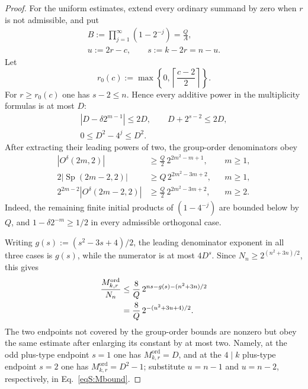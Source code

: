 \documentclass[journal,twocolumn]{IEEEtran}
\theoremstyle{definition}
\theoremstyle{plain}
\newcommand{\Ord}{\mathrm{ord}}
\newcommand{\Sp}{\operatorname{Sp}}
\begin{document}
\begin{proof}
For the uniform estimates, extend every ordinary summand by zero when $r$ is
not admissible, and put
\begin{equation}
 \begin{gathered}
 B:=\prod_{j=1}^{\infty}(1-2^{-j})=\frac QA,\\
 u:=2r-c,\qquad s:=k-2r=n-u.
 \end{gathered}
 \label{eqS:B-u}
\end{equation}
Let
\begin{equation}
 r_0(c):=\max\left\{0,\left\lceil\frac{c-2}{2}\right\rceil\right\}.
\end{equation}
For $r\geq r_0(c)$ one has $s-2\leq n$.  Hence every additive power in the
multiplicity formulas is at most $D$:
\begin{equation}
 \begin{gathered}
 |D-\delta2^{m-1}|\leq2D,\qquad D+2^{s-2}\leq2D,\\
 0\leq D^2-4^j\leq D^2.
 \end{gathered}
 \label{eqS:multiplicity-factor-bounds}
\end{equation}
After extracting their leading powers of two, the group-order denominators
obey
\begin{align}
 |O^\delta(2m,2)|
 &\geq \frac Q2\,2^{2m^2-m+1},
 &&m\geq1,\label{eqS:O-lower}\\
 2|\Sp(2m-2,2)|
 &\geq Q\,2^{2m^2-3m+2},
 &&m\geq1,\label{eqS:Sp-lower}\\
 2^{2m-2}|O^\delta(2m-2,2)|
 &\geq \frac Q2\,2^{2m^2-3m+2},
 &&m\geq2.\label{eqS:Ozero-lower}
\end{align}
Indeed, the remaining finite initial products of $(1-4^{-j})$ are bounded
below by $Q$, and $1-\delta2^{-m}\geq1/2$ in every admissible orthogonal
case.

Writing $g(s):=(s^2-3s+4)/2$, the leading denominator exponent in all three
cases is $g(s)$, while the numerator is at most $4D^s$.  Since
$N_n\geq2^{(n^2+3n)/2}$, this gives
\begin{align}
 \frac{M^{\Ord}_{k,r}}{N_n}
 &\leq\frac8Q\,2^{ns-g(s)-(n^2+3n)/2}\notag\\
 &=\frac8Q\,2^{-(u^2+3u+4)/2}.
 \label{eqS:Mbound}
\end{align}
The two endpoints not covered by the group-order bounds are nonzero but obey
the same estimate after enlarging its constant by at most two.  Namely, at
the odd plus-type endpoint $s=1$ one has $M^{\Ord}_{k,r}=D$, and at the
$4\mid k$ plus-type endpoint $s=2$ one has
$M^{\Ord}_{k,r}=D^2-1$; substitute $u=n-1$ and $u=n-2$, respectively, in
Eq.~\eqref{eqS:Mbound}.


\end{proof}
\end{document}
